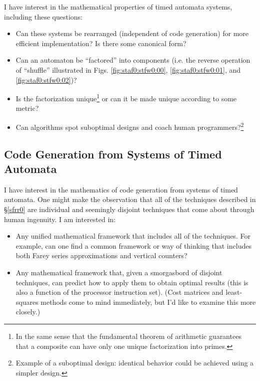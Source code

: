 \documentclass[letterpaper,10pt,titlepage]{article}
\begin{document}
I have interest in the mathematical properties of timed automata systems,
including these questions:

\begin{itemize}
\item Can these systems be rearranged (independent of code generation) for more 
      efficient implementation?  Is there some canonical form?
\item Can an automaton be ``factored'' into components (i.e. the reverse
      operation of ``shuffle'' illustrated in Figs. 
      \ref{fig:staf0:stfw0:00}, \ref{fig:staf0:stfw0:01}, and \ref{fig:staf0:stfw0:02})?
\item Is the factorization unique\footnote{In the same sense that the
      fundamental theorem of arithmetic guarantees that a composite
      can have only one unique factorization into primes.} 
      or can it be made unique according
      to some metric?
\item Can algorithms spot suboptimal designs and coach
      human programmers?\footnote{Example of a suboptimal design:
      identical behavior could be achieved using a simpler design.}
\end{itemize}


\subsection{Code Generation from Systems of Timed Automata}
\label{srin0:snvf0}

I have interest in the mathematics of code generation from systems of timed
automata.  One might make the observation that all of the techniques 
described in \S{}\ref{sfrr0} are individual and seemingly disjoint techniques that
come about through human ingenuity.  I am interested in:

\begin{itemize}
\item Any unified mathematical framework that includes all of the techniques.
      For example, can one find a common framework or way of thinking that includes both
      Farey series approximations and vertical counters?
\item Any mathematical framework that, given a smorgasbord of disjoint techniques,
      can predict how to apply them to obtain optimal results (this is also 
      a function of the processor instruction set).  (Cost matrices and
      least-squares methods come to mind immediately, but I'd like to examine
      this more closely.)
\end{itemize}
\end{document}
